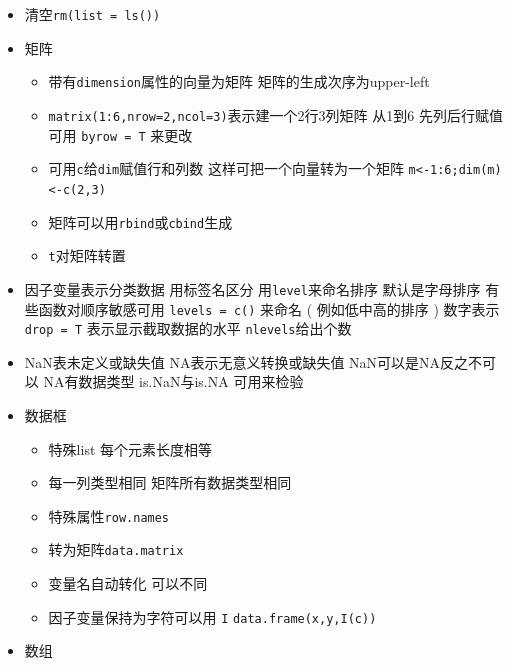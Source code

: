 \documentclass[
]{book}
\providecommand{\tightlist}{%
  \setlength{\itemsep}{0pt}\setlength{\parskip}{0pt}}
\begin{document}
\begin{itemize}
\tightlist
\item
  清空\texttt{rm(list\ =\ ls())}
\item
  矩阵

  \begin{itemize}
  \tightlist
  \item
    带有\texttt{dimension}属性的向量为矩阵 矩阵的生成次序为upper-left
  \item
    \texttt{matrix(1:6,nrow=2,ncol=3)}表示建一个2行3列矩阵 从1到6 先列后行赋值 可用 \texttt{byrow\ =\ T} 来更改
  \item
    可用\texttt{c}给\texttt{dim}赋值行和列数 这样可把一个向量转为一个矩阵 \texttt{m\textless{}-1:6;dim(m)\textless{}-c(2,3)}
  \item
    矩阵可以用\texttt{rbind}或\texttt{cbind}生成
  \item
    \texttt{t}对矩阵转置
  \end{itemize}
\item
  因子变量表示分类数据 用标签名区分 用\texttt{level}来命名排序 默认是字母排序 有些函数对顺序敏感可用 \texttt{levels\ =\ c()} 来命名 ( 例如低中高的排序 ) 数字表示 \texttt{drop\ =\ T} 表示显示截取数据的水平 \texttt{nlevels}给出个数
\item
  NaN表未定义或缺失值 NA表示无意义转换或缺失值 NaN可以是NA反之不可以 NA有数据类型 is.NaN与is.NA 可用来检验
\item
  数据框

  \begin{itemize}
  \tightlist
  \item
    特殊list 每个元素长度相等
  \item
    每一列类型相同 矩阵所有数据类型相同
  \item
    特殊属性\texttt{row.names}
  \item
    转为矩阵\texttt{data.matrix}
  \item
    变量名自动转化 可以不同
  \item
    因子变量保持为字符可以用 \texttt{I} \texttt{data.frame(x,y,I(c))}
  \end{itemize}
\item
  数组


\end{itemize}
\end{document}
